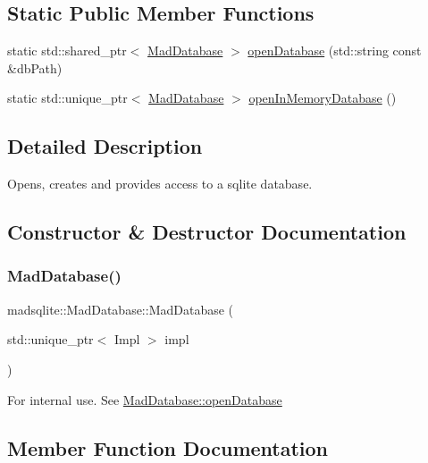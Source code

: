\subsection*{Static Public Member Functions}
\begin{DoxyCompactItemize}
\item 
static std\+::shared\+\_\+ptr$<$ \hyperlink{classmadsqlite_1_1_mad_database}{Mad\+Database} $>$ \hyperlink{classmadsqlite_1_1_mad_database_a68c5b61e4cf000f4947f9c43a2c12338}{open\+Database} (std\+::string const \&db\+Path)
\item 
static std\+::unique\+\_\+ptr$<$ \hyperlink{classmadsqlite_1_1_mad_database}{Mad\+Database} $>$ \hyperlink{classmadsqlite_1_1_mad_database_a29c3ca4b75520e39977ca37ea71354b6}{open\+In\+Memory\+Database} ()
\end{DoxyCompactItemize}


\subsection{Detailed Description}
Opens, creates and provides access to a sqlite database. 

\subsection{Constructor \& Destructor Documentation}
\hypertarget{classmadsqlite_1_1_mad_database_a11eaaa62452515ae78f3879616862213}{}\label{classmadsqlite_1_1_mad_database_a11eaaa62452515ae78f3879616862213} 
\subsubsection{\texorpdfstring{Mad\+Database()}{MadDatabase()}}
{\footnotesize\ttfamily madsqlite\+::\+Mad\+Database\+::\+Mad\+Database (\begin{DoxyParamCaption}\item[{std\+::unique\+\_\+ptr$<$ Impl $>$}]{impl }\end{DoxyParamCaption})}

For internal use. See \hyperlink{classmadsqlite_1_1_mad_database_a68c5b61e4cf000f4947f9c43a2c12338}{Mad\+Database\+::open\+Database} 

\subsection{Member Function Documentation}
\hypertarget{classmadsqlite_1_1_mad_database_a985f7430489959d345b01ffc191a70d5}{}\label{classmadsqlite_1_1_mad_database_a985f7430489959d345b01ffc191a70d5} 
